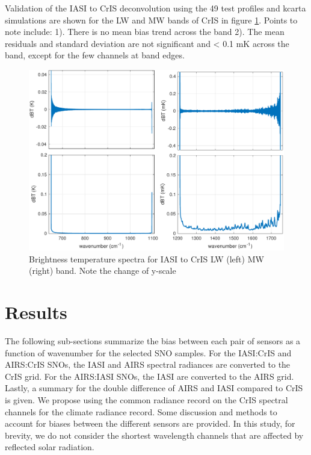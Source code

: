 \documentclass[twocolumn,10pt]{article}
\begin{document}

Validation of the IASI to CrIS deconvolution using the 49 test profiles and kcarta simulations are shown for the LW and MW bands of CrIS in figure \ref{fig:2a}. Points to note include: 1). There is no mean bias trend across the band 2). The mean residuals and standard deviation are not significant and < 0.1 mK across the band, except for the few channels at band edges.

\begin{figure}[htb]
\centering
\includegraphics[width=\linewidth]{./figs/iasi2cris_validation_LW_MW.pdf}
\caption{
  Brightness temperature spectra for IASI to CrIS LW (left) MW (right) band. Note the change of y-scale}
\label{fig:2a}
\end{figure}



\section{Results}
The following sub-sections summarize the bias between each pair of sensors as a function of wavenumber for the selected SNO samples. For the IASI:CrIS and AIRS:CrIS SNOs, the IASI and AIRS spectral radiances are converted to the CrIS grid.  For the AIRS:IASI SNOs, the IASI are converted to the AIRS grid. Lastly, a summary for the double difference of AIRS and IASI compared to CrIS is given. We propose using the common radiance record on the CrIS spectral channels for the climate radiance record. Some discussion and methods to account for biases between the different sensors are provided. In this study, for brevity, we do not consider the shortest wavelength channels that are affected by reflected solar radiation.
\end{document}
